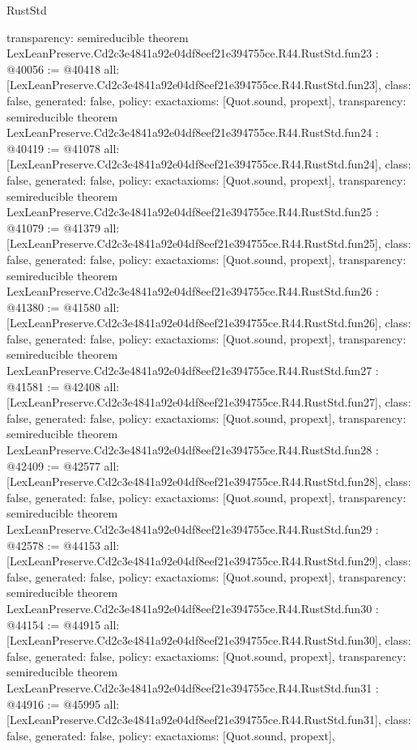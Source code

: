 \begin{lexlean}{RustStd}
\begin{coremodule}
{  transparency: semireducible
}
theorem LexLeanPreserve.Cd2c3e4841a92e04df8eef21e394755ce.R44.RustStd.fun23 : @40056 := @40418 {
  all: [LexLeanPreserve.Cd2c3e4841a92e04df8eef21e394755ce.R44.RustStd.fun23],
  class: false,
  generated: false,
  policy: exact{axioms: [Quot.sound, propext]},
  transparency: semireducible
}
theorem LexLeanPreserve.Cd2c3e4841a92e04df8eef21e394755ce.R44.RustStd.fun24 : @40419 := @41078 {
  all: [LexLeanPreserve.Cd2c3e4841a92e04df8eef21e394755ce.R44.RustStd.fun24],
  class: false,
  generated: false,
  policy: exact{axioms: [Quot.sound, propext]},
  transparency: semireducible
}
theorem LexLeanPreserve.Cd2c3e4841a92e04df8eef21e394755ce.R44.RustStd.fun25 : @41079 := @41379 {
  all: [LexLeanPreserve.Cd2c3e4841a92e04df8eef21e394755ce.R44.RustStd.fun25],
  class: false,
  generated: false,
  policy: exact{axioms: [Quot.sound, propext]},
  transparency: semireducible
}
theorem LexLeanPreserve.Cd2c3e4841a92e04df8eef21e394755ce.R44.RustStd.fun26 : @41380 := @41580 {
  all: [LexLeanPreserve.Cd2c3e4841a92e04df8eef21e394755ce.R44.RustStd.fun26],
  class: false,
  generated: false,
  policy: exact{axioms: [Quot.sound, propext]},
  transparency: semireducible
}
theorem LexLeanPreserve.Cd2c3e4841a92e04df8eef21e394755ce.R44.RustStd.fun27 : @41581 := @42408 {
  all: [LexLeanPreserve.Cd2c3e4841a92e04df8eef21e394755ce.R44.RustStd.fun27],
  class: false,
  generated: false,
  policy: exact{axioms: [Quot.sound, propext]},
  transparency: semireducible
}
theorem LexLeanPreserve.Cd2c3e4841a92e04df8eef21e394755ce.R44.RustStd.fun28 : @42409 := @42577 {
  all: [LexLeanPreserve.Cd2c3e4841a92e04df8eef21e394755ce.R44.RustStd.fun28],
  class: false,
  generated: false,
  policy: exact{axioms: [Quot.sound, propext]},
  transparency: semireducible
}
theorem LexLeanPreserve.Cd2c3e4841a92e04df8eef21e394755ce.R44.RustStd.fun29 : @42578 := @44153 {
  all: [LexLeanPreserve.Cd2c3e4841a92e04df8eef21e394755ce.R44.RustStd.fun29],
  class: false,
  generated: false,
  policy: exact{axioms: [Quot.sound, propext]},
  transparency: semireducible
}
theorem LexLeanPreserve.Cd2c3e4841a92e04df8eef21e394755ce.R44.RustStd.fun30 : @44154 := @44915 {
  all: [LexLeanPreserve.Cd2c3e4841a92e04df8eef21e394755ce.R44.RustStd.fun30],
  class: false,
  generated: false,
  policy: exact{axioms: [Quot.sound, propext]},
  transparency: semireducible
}
theorem LexLeanPreserve.Cd2c3e4841a92e04df8eef21e394755ce.R44.RustStd.fun31 : @44916 := @45995 {
  all: [LexLeanPreserve.Cd2c3e4841a92e04df8eef21e394755ce.R44.RustStd.fun31],
  class: false,
  generated: false,
  policy: exact{axioms: [Quot.sound, propext]},
}
\end{coremodule}
\end{lexlean}

